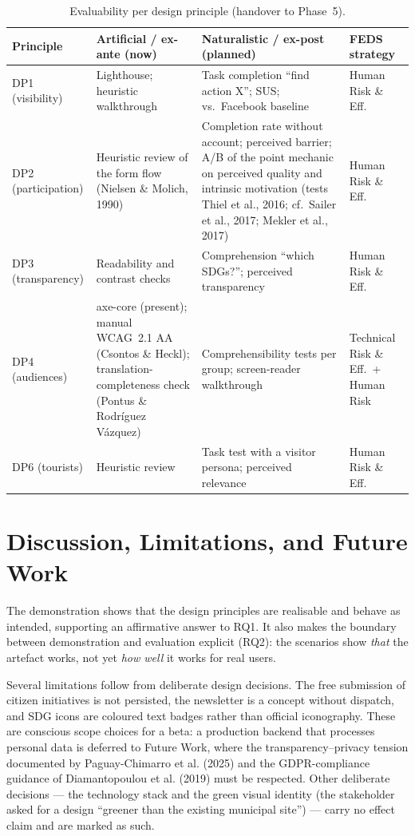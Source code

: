 \documentclass[11pt,a4paper]{article}
\begin{document}
\begin{table}[h]
\centering\small
\begin{tabular}{p{2.3cm}p{4.3cm}p{4.3cm}p{2.4cm}}
\hline
\textbf{Principle} & \textbf{Artificial / ex-ante (now)} & \textbf{Naturalistic / ex-post (planned)} & \textbf{FEDS strategy}\\
\hline
DP1 (visibility) & Lighthouse; heuristic walkthrough & Task completion ``find action X''; SUS; vs.\ Facebook baseline & Human Risk \& Eff.\\
DP2 (participation) & Heuristic review of the form flow (Nielsen \& Molich, 1990) & Completion rate without account; perceived barrier; A/B of the point mechanic on perceived quality and intrinsic motivation (tests Thiel et al., 2016; cf.\ Sailer et al., 2017; Mekler et al., 2017) & Human Risk \& Eff.\\
DP3 (transparency) & Readability and contrast checks & Comprehension ``which SDGs?''; perceived transparency & Human Risk \& Eff.\\
DP4 (audiences) & axe-core (present); manual WCAG~2.1 AA (Csontos \& Heckl); translation-completeness check (Pontus \& Rodr\'iguez V\'azquez) & Comprehensibility tests per group; screen-reader walkthrough & Technical Risk \& Eff.\ + Human Risk\\
DP6 (tourists) & Heuristic review & Task test with a visitor persona; perceived relevance & Human Risk \& Eff.\\
\hline
\end{tabular}
\caption{Evaluability per design principle (handover to Phase~5).}
\label{tab:eval}
\end{table}

\section{Discussion, Limitations, and Future Work}

The demonstration shows that the design principles are realisable and behave as intended, supporting an affirmative answer to RQ1. It also makes the boundary between demonstration and evaluation explicit (RQ2): the scenarios show \emph{that} the artefact works, not yet \emph{how well} it works for real users.

Several limitations follow from deliberate design decisions. The free submission of citizen initiatives is not persisted, the newsletter is a concept without dispatch, and SDG icons are coloured text badges rather than official iconography. These are conscious scope choices for a beta: a production backend that processes personal data is deferred to Future Work, where the transparency--privacy tension documented by Paguay-Chimarro et al. (2025) and the GDPR-compliance guidance of Diamantopoulou et al. (2019) must be respected. Other deliberate decisions --- the technology stack and the green visual identity (the stakeholder asked for a design ``greener than the existing municipal site'') --- carry no effect claim and are marked as such.
\end{document}
